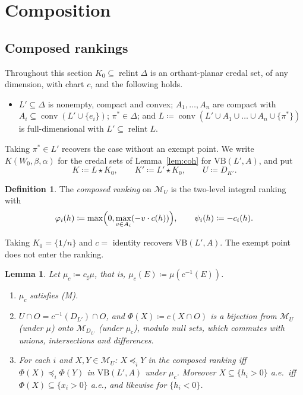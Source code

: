 \documentclass[11pt]{article}
\newcommand{\one}{\mathbf{1}}
\newcommand{\M}{\mathcal{M}}
\newcommand{\VB}{\mathrm{VB}}
\DeclareMathOperator{\conv}{conv}
\DeclareMathOperator{\relint}{relint}
\theoremstyle{plain}
\newtheorem{lemma}[theorem]{Lemma}
\theoremstyle{definition}
\newtheorem{definition}[theorem]{Definition}
\theoremstyle{remark}
\begin{document}
\section{Composition}\label{sec:comp}

\subsection{Composed rankings}

Throughout this section $K_0\subseteq\relint\Delta$ is an orthant-planar credal set, of any
dimension, with chart $c$, and the following holds.
\begin{itemize}
  \item[(L)] $L'\subseteq\Delta$ is nonempty, compact and convex; $A_1,\dots,A_n$ are
  compact with $A_i\subseteq\conv(L'\cup\{e_i\})$; $\pi^\ast\in\Delta$; and
  $L\coloneqq\conv(L'\cup A_1\cup\dots\cup A_n\cup\{\pi^\ast\})$ is full-dimensional with
  $L'\subseteq\relint L$.
\end{itemize}
Taking $\pi^\ast\in L'$ recovers the case without an exempt point. We write
$K(W_0,\beta,\alpha)$ for the credal sets of Lemma~\ref{lem:coh} for $\VB(L',A)$, and put
\[
  K\coloneqq L\star K_0,\qquad K'\coloneqq L'\star K_0,\qquad U\coloneqq D_{K'}.
\]

\begin{definition}\label{def:composed}
The \emph{composed ranking} on $\M_U$ is the two-level integral ranking with
\[
  \varphi_i(h)\coloneqq\max\Bigl(0,\max_{v\in A_i}(-v\cdot c(h))\Bigr),\qquad
  \psi_i(h)\coloneqq-c_i(h).
\]
\end{definition}

Taking $K_0=\{\one/n\}$ and $c=$ identity recovers $\VB(L',A)$. The exempt point does not
enter the ranking.

\begin{lemma}\label{lem:conj}
Let $\mu_c\coloneqq c_\sharp\mu$, that is, $\mu_c(E)\coloneqq\mu(c^{-1}(E))$.
\begin{enumerate}[label=(\alph*)]
  \item $\mu_c$ satisfies (M).
  \item $U\cap O=c^{-1}(D_{L'})\cap O$, and $\Phi(X)\coloneqq c(X\cap O)$ is a bijection
  from $\M_U$ (under $\mu$) onto $\M_{D_{L'}}$ (under $\mu_c$), modulo null sets, which
  commutes with unions, intersections and differences.
  \item For each $i$ and $X,Y\in\M_U$: $X\preceq_iY$ in the composed ranking iff
  $\Phi(X)\preceq_i\Phi(Y)$ in $\VB(L',A)$ under $\mu_c$. Moreover $X\subseteq\{h_i>0\}$
  a.e.\ iff $\Phi(X)\subseteq\{x_i>0\}$ a.e., and likewise for $\{h_i<0\}$.
\end{enumerate}
\end{lemma}
\end{document}
